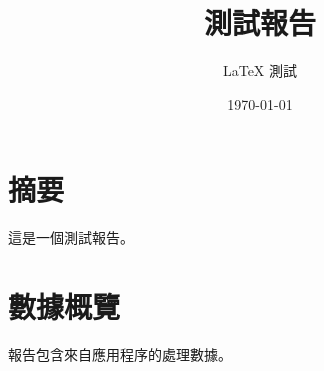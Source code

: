 \documentclass{ctexart}
\title{測試報告}
\author{LaTeX 測試}
\date{\today}
\begin{document}
\maketitle
\section{摘要}
這是一個測試報告。
\section{數據概覽}
報告包含來自應用程序的處理數據。
\end{document}
